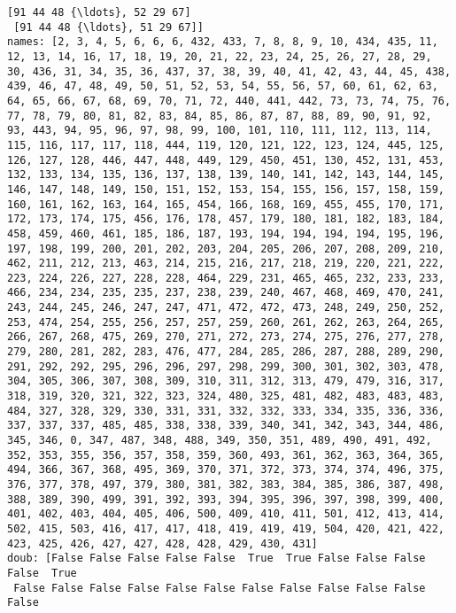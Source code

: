 \documentclass[11pt]{article}
\begin{document}
\begin{Verbatim}[commandchars=\\\{\}]
 [91 44 48 {\ldots}, 52 29 67]
 [91 44 48 {\ldots}, 51 29 67]]
names: [2, 3, 4, 5, 6, 6, 6, 432, 433, 7, 8, 8, 9, 10, 434, 435, 11, 12, 13, 14, 16, 17, 18, 19, 20, 21, 22, 23, 24, 25, 26, 27, 28, 29, 30, 436, 31, 34, 35, 36, 437, 37, 38, 39, 40, 41, 42, 43, 44, 45, 438, 439, 46, 47, 48, 49, 50, 51, 52, 53, 54, 55, 56, 57, 60, 61, 62, 63, 64, 65, 66, 67, 68, 69, 70, 71, 72, 440, 441, 442, 73, 73, 74, 75, 76, 77, 78, 79, 80, 81, 82, 83, 84, 85, 86, 87, 87, 88, 89, 90, 91, 92, 93, 443, 94, 95, 96, 97, 98, 99, 100, 101, 110, 111, 112, 113, 114, 115, 116, 117, 117, 118, 444, 119, 120, 121, 122, 123, 124, 445, 125, 126, 127, 128, 446, 447, 448, 449, 129, 450, 451, 130, 452, 131, 453, 132, 133, 134, 135, 136, 137, 138, 139, 140, 141, 142, 143, 144, 145, 146, 147, 148, 149, 150, 151, 152, 153, 154, 155, 156, 157, 158, 159, 160, 161, 162, 163, 164, 165, 454, 166, 168, 169, 455, 455, 170, 171, 172, 173, 174, 175, 456, 176, 178, 457, 179, 180, 181, 182, 183, 184, 458, 459, 460, 461, 185, 186, 187, 193, 194, 194, 194, 194, 195, 196, 197, 198, 199, 200, 201, 202, 203, 204, 205, 206, 207, 208, 209, 210, 462, 211, 212, 213, 463, 214, 215, 216, 217, 218, 219, 220, 221, 222, 223, 224, 226, 227, 228, 228, 464, 229, 231, 465, 465, 232, 233, 233, 466, 234, 234, 235, 235, 237, 238, 239, 240, 467, 468, 469, 470, 241, 243, 244, 245, 246, 247, 247, 471, 472, 472, 473, 248, 249, 250, 252, 253, 474, 254, 255, 256, 257, 257, 259, 260, 261, 262, 263, 264, 265, 266, 267, 268, 475, 269, 270, 271, 272, 273, 274, 275, 276, 277, 278, 279, 280, 281, 282, 283, 476, 477, 284, 285, 286, 287, 288, 289, 290, 291, 292, 292, 295, 296, 296, 297, 298, 299, 300, 301, 302, 303, 478, 304, 305, 306, 307, 308, 309, 310, 311, 312, 313, 479, 479, 316, 317, 318, 319, 320, 321, 322, 323, 324, 480, 325, 481, 482, 483, 483, 483, 484, 327, 328, 329, 330, 331, 331, 332, 332, 333, 334, 335, 336, 336, 337, 337, 337, 485, 485, 338, 338, 339, 340, 341, 342, 343, 344, 486, 345, 346, 0, 347, 487, 348, 488, 349, 350, 351, 489, 490, 491, 492, 352, 353, 355, 356, 357, 358, 359, 360, 493, 361, 362, 363, 364, 365, 494, 366, 367, 368, 495, 369, 370, 371, 372, 373, 374, 374, 496, 375, 376, 377, 378, 497, 379, 380, 381, 382, 383, 384, 385, 386, 387, 498, 388, 389, 390, 499, 391, 392, 393, 394, 395, 396, 397, 398, 399, 400, 401, 402, 403, 404, 405, 406, 500, 409, 410, 411, 501, 412, 413, 414, 502, 415, 503, 416, 417, 417, 418, 419, 419, 419, 504, 420, 421, 422, 423, 425, 426, 427, 427, 428, 428, 429, 430, 431]
doub: [False False False False False  True  True False False False False  True
 False False False False False False False False False False False False

\end{Verbatim}
\end{document}
